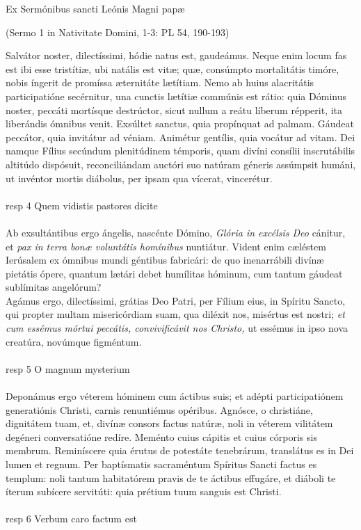 \documentclass[options]{article}
\begin{document}
	Ex Sermónibus sancti Leónis Magni papæ
	\begin{flushright}
	 (Sermo 1 in Nativitate Domini, 1-3: PL 54, 190-193)	
	\end{flushright}
Salvátor noster, dilectíssimi, hódie natus est, gaudeámus. Neque enim locum fas est ibi esse tristítiæ, ubi natális est vitæ; quæ, consúmpto mortalitátis timóre, nobis íngerit de promíssa æternitáte lætítiam.
Nemo ab huius alacritátis participatióne secérnitur, una cunctis lætítiæ commúnis est rátio: quia Dóminus noster, peccáti mortísque destrúctor, sicut nullum a reátu líberum répperit, ita liberándis ómnibus venit. Exsúltet sanctus, quia propínquat ad palmam. Gáudeat peccátor, quia invitátur ad véniam. Animétur gentílis, quia vocátur ad vitam.
Dei namque Fílius secúndum plenitúdinem témporis, quam divíni consílii inscrutábilis altitúdo dispósuit, reconciliándam auctóri suo natúram géneris assúmpsit humáni, ut invéntor mortis diábolus, per ipsam qua vícerat, vincerétur.\\
\\
resp 4 Quem vidistis pastores dicite \\
\\
Ab exsultántibus ergo ángelis, nascénte Dómino, \emph{Glória in excélsis Deo} cánitur, et \emph{pax in terra bonæ voluntátis homínibus} nuntiátur. Vident enim cæléstem Ierúsalem ex ómnibus mundi géntibus fabricári: de quo inenarrábili divínæ pietátis ópere, quantum lætári debet humílitas hóminum, cum tantum gáudeat sublímitas angelórum?\\
Agámus ergo, dilectíssimi, grátias Deo Patri, per Fílium eius, in Spíritu Sancto, qui propter multam misericórdiam suam, qua diléxit nos, misértus est nostri; \emph{et cum essémus mórtui peccátis, convivificávit nos Christo,} ut essémus in ipso nova creatúra, novúmque figméntum.\\
\\
resp 5 O magnum mysterium\\
\\
Deponámus ergo véterem hóminem cum áctibus suis; et adépti participatiónem generatiónis Christi, carnis renuntiémus opéribus.
Agnósce, o christiáne, dignitátem tuam, et, divínæ consors factus natúræ, noli in véterem vilitátem degéneri conversatióne redíre. Meménto cuius cápitis et cuius córporis sis membrum. Reminíscere quia érutus de potestáte tenebrárum, translátus es in Dei lumen et regnum.
Per baptísmatis sacraméntum Spíritus Sancti factus es templum: noli tantum habitatórem pravis de te áctibus effugáre, et diáboli te íterum subícere servitúti: quia prétium tuum sanguis est Christi.\\
\\
resp 6 Verbum caro factum est
\end{document}
